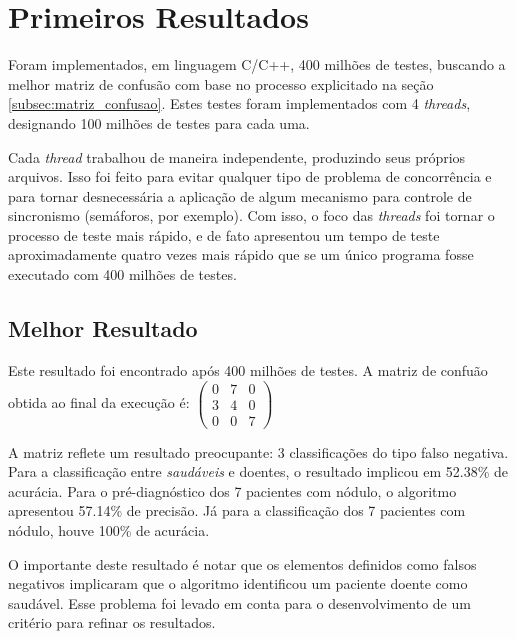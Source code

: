 \documentclass[a4paper,12pt,oneside]{report}
\begin{document}
\section {Primeiros Resultados}
\label{sec:primeiros_resultados}
\hspace*{+15pt} Foram implementados, em linguagem C/C++, 400 milh\~{o}es de testes, buscando a melhor matriz de confus\~{a}o com base no processo explicitado na se\c{c}\~{a}o \ref{subsec:matriz_confusao}. Estes testes foram implementados com 4 \textit{threads}, designando 100 milh\~{o}es de testes para cada uma. 
\\
\par Cada \textit{thread} trabalhou de maneira independente, produzindo seus pr\'{o}prios arquivos. Isso foi feito para evitar qualquer tipo de problema de concorr\^{e}ncia e para tornar desnecess\'{a}ria a aplica\c{c}\~{a}o de algum mecanismo para controle de sincronismo (sem\'{a}foros, por exemplo). Com isso, o foco das \textit{threads} foi tornar o processo de teste mais r\'{a}pido, e de fato apresentou um tempo de teste aproximadamente quatro vezes mais r\'{a}pido que se um \'{u}nico programa fosse executado com 400 milh\~{o}es de testes. 
\subsection{Melhor Resultado}
\hspace*{15pt} Este resultado foi encontrado ap\'{o}s 400 milh\~{o}es de testes. A matriz de confu\~{a}o obtida ao final da execu\c{c}\~{a}o \'{e}:
$
\left(\begin{smallmatrix}
0 & 7 & 0 \\
3 & 4 & 0 \\
0 & 0 & 7 
\end{smallmatrix}\right)
$
\\
\par A matriz reflete um resultado preocupante: 3 classifica\c{c}\~{o}es do tipo  falso negativa. Para a classifica\c{c}\~{a}o entre \emph{saud\'{a}veis} e doentes, o resultado implicou em 52.38\% de acur\'{a}cia. Para o pr\'{e}-diagn\'{o}stico dos 7 pacientes com n\'{o}dulo, o algoritmo apresentou 57.14\% de precis\~{a}o. J\'{a} para a classifica\c{c}\~{a}o dos 7 pacientes com n\'{o}dulo, houve 100\% de acur\'{a}cia.
\\
\par O importante deste resultado \'{e} notar que os elementos definidos como falsos negativos implicaram que o algoritmo identificou um paciente doente como saud\'{a}vel. Esse problema foi levado em conta para o desenvolvimento de um crit\'{e}rio para refinar os resultados. 
\end{document}
